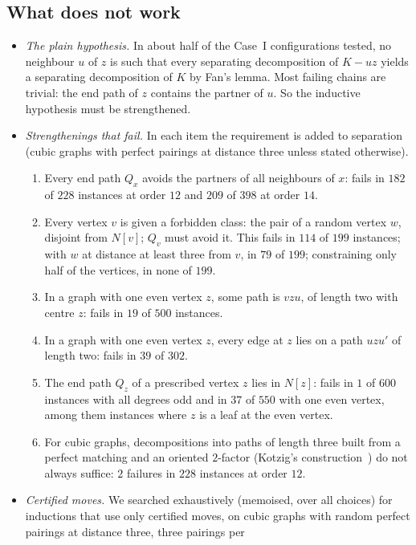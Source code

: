\documentclass[11pt]{amsart}
\theoremstyle{definition}
\begin{document}
\subsection*{What does not work}
\begin{itemize}
\item \emph{The plain hypothesis.} In about half of the Case~I configurations tested, no neighbour $u$ of
$z$ is such that every separating decomposition of $K-uz$ yields a separating decomposition of $K$ by
Fan's lemma. Most failing chains are trivial: the end path of $z$ contains the partner of $u$. So the
inductive hypothesis must be strengthened.
\item \emph{Strengthenings that fail.} In each item the requirement is added to separation (cubic graphs
with perfect pairings at distance three unless stated otherwise).
\begin{enumerate}
\item[(a)] Every end path $Q_x$ avoids the partners of all neighbours of $x$: fails in $182$ of $228$
instances at order $12$ and $209$ of $398$ at order $14$.
\item[(b)] Every vertex $v$ is given a forbidden class: the pair of a random vertex $w$, disjoint from
$N[v]$; $Q_v$ must avoid it. This fails in $114$ of $199$ instances; with $w$ at distance at least three
from $v$, in $79$ of $199$; constraining only half of the vertices, in none of $199$.
\item[(c)] In a graph with one even vertex $z$, some path is $vzu$, of length two with centre $z$: fails in
$19$ of $500$ instances.
\item[(d)] In a graph with one even vertex $z$, every edge at $z$ lies on a path $uzu'$ of length two: fails
in $39$ of $302$.
\item[(e)] The end path $Q_z$ of a prescribed vertex $z$ lies in $N[z]$: fails in $1$ of $600$ instances
with all degrees odd and in $37$ of $550$ with one even vertex, among them instances where $z$ is a leaf
at the even vertex.
\item[(f)] For cubic graphs, decompositions into paths of length three built from a perfect matching and an
oriented $2$-factor (Kotzig's construction~\cite{Kot57}) do not always suffice: $2$ failures in $228$
instances at order $12$.
\end{enumerate}
\item \emph{Certified moves.} We searched exhaustively (memoised, over all choices) for inductions that use
only certified moves, on cubic graphs with random perfect pairings at distance three, three pairings per

\end{itemize}
\end{document}
